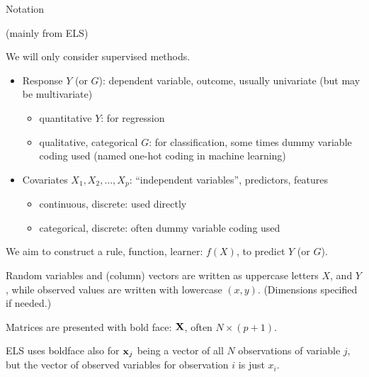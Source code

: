 \documentclass[
  ignorenonframetext,
]{beamer}
\providecommand{\tightlist}{%
  \setlength{\itemsep}{0pt}\setlength{\parskip}{0pt}}
\begin{document}
\begin{frame}

\begin{block}{Notation}

(mainly from ELS)

We will only consider supervised methods.

\begin{itemize}
\tightlist
\item
  Response \(Y\) (or \(G\)): dependent variable, outcome, usually
  univariate (but may be multivariate)

  \begin{itemize}
  \tightlist
  \item
    quantitative \(Y\): for regression
  \item
    qualitative, categorical \(G\): for classification, some times dummy
    variable coding used (named one-hot coding in machine learning)
  \end{itemize}
\item
  Covariates \(X_1, X_2, \ldots, X_p\): ``independent variables'',
  predictors, features

  \begin{itemize}
  \tightlist
  \item
    continuous, discrete: used directly
  \item
    categorical, discrete: often dummy variable coding used
  \end{itemize}
\end{itemize}

We aim to construct a rule, function, learner: \(f(X)\), to predict
\(Y\) (or \(G\)).

\end{block}

\end{frame}

\begin{frame}

Random variables and (column) vectors are written as uppercase letters
\(X\), and \(Y\), while observed values are written with lowercase
\((x,y)\). (Dimensions specified if needed.)

Matrices are presented with bold face: \({\bf X}\), often
\(N \times (p+1)\).

ELS uses boldface also for \({\bf x}_j\) being a vector of all \(N\)
observations of variable \(j\), but the vector of observed variables for
observation \(i\) is just \(x_i\).

\end{frame}
\end{document}
